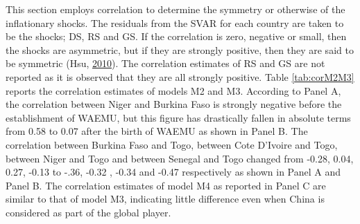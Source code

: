\documentclass[]{article}
\begin{document}
This section employs correlation to determine the symmetry or otherwise of the inflationary shocks. The residuals from the SVAR for each country are taken to be the shocks; DS, RS and GS. If the correlation is zero, negative or small, then the shocks are asymmetric, but if they are strongly positive, then they are said to be symmetric (Hsu, \protect\hyperlink{ref-hsu2010common}{2010}). The correlation estimates of RS and GS are not reported as it is observed that they are all strongly positive. Table \ref{tab:corM2M3} reports the correlation estimates of models M2 and M3. According to Panel A, the correlation between Niger and Burkina Faso is strongly negative before the establishment of WAEMU, but this figure has drastically fallen in absolute terms from 0.58 to 0.07 after the birth of WAEMU as shown in Panel B. The correlation between Burkina Faso and Togo, between Cote D'Ivoire and Togo, between Niger and Togo and between Senegal and Togo changed from -0.28, 0.04, 0.27, -0.13 to -.36, -0.32 , -0.34 and -0.47 respectively as shown in Panel A and Panel B. The correlation estimates of model M4 as reported in Panel C are similar to that of model M3, indicating little difference even when China is considered as part of the global player.
\end{document}
